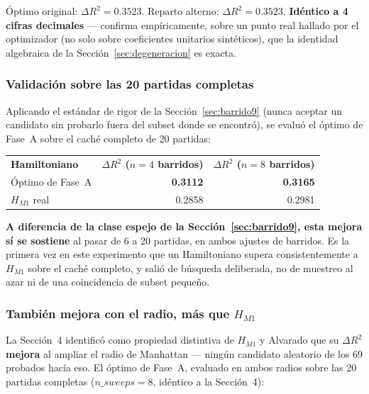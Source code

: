 \documentclass[11pt, a4paper]{article}
\newcommand{\TH}[1]{\cellcolor{cTHbg}\color{white}\textbf{#1}}
\newcommand{\good}[1]{\color{cGood}\textbf{#1}}
\begin{document}
\begin{tcolorbox}[quotebox]
  \'Optimo original: $\Delta R^2=0.3523$. Reparto alterno:
  $\Delta R^2=0.3523$. \textbf{Id\'entico a 4 cifras decimales} ---
  confirma emp\'iricamente, sobre un punto real hallado por el
  optimizador (no solo sobre coeficientes unitarios sint\'eticos),
  que la identidad algebraica de la Secci\'on~\ref{sec:degeneracion}
  es exacta.
\end{tcolorbox}

\subsubsection{Validaci\'on sobre las 20 partidas completas}

Aplicando el est\'andar de rigor de la Secci\'on~\ref{sec:barrido9}
(nunca aceptar un candidato sin probarlo fuera del subset donde se
encontr\'o), se evalu\'o el \'optimo de Fase~A sobre el cach\'e
completo de 20 partidas:

\medskip
\begin{center}
\begin{tabular}{lrr}
  \TH{Hamiltoniano} & \TH{$\Delta R^2$ ($n{=}4$ barridos)} & \TH{$\Delta R^2$ ($n{=}8$ barridos)} \\[1pt]
  \'Optimo de Fase~A & \good{0.3112} & \good{0.3165} \\
  $H_{M1}$ real       & 0.2858 & 0.2981 \\
\end{tabular}
\end{center}
\medskip

\begin{tcolorbox}[quotebox]
  \textbf{A diferencia de la clase espejo de la
  Secci\'on~\ref{sec:barrido9}, esta mejora s\'i se sostiene} al pasar
  de 6 a 20 partidas, en ambos ajustes de barridos. Es la primera vez
  en este experimento que un Hamiltoniano supera consistentemente a
  $H_{M1}$ sobre el cach\'e completo, y sali\'o de b\'usqueda
  deliberada, no de muestreo al azar ni de una coincidencia de subset
  peque\~no.
\end{tcolorbox}

\subsubsection{Tambi\'en mejora con el radio, m\'as que $H_{M1}$}

La Secci\'on~4 identific\'o como propiedad distintiva de $H_{M1}$ y
Alvarado que su $\Delta R^2$ \textbf{mejora} al ampliar el radio de
Manhattan --- ning\'un candidato aleatorio de los 69 probados hac\'ia
eso. El \'optimo de Fase~A, evaluado en ambos radios sobre las 20
partidas completas ($n\_sweeps=8$, id\'entico a la Secci\'on~4):
\end{document}
